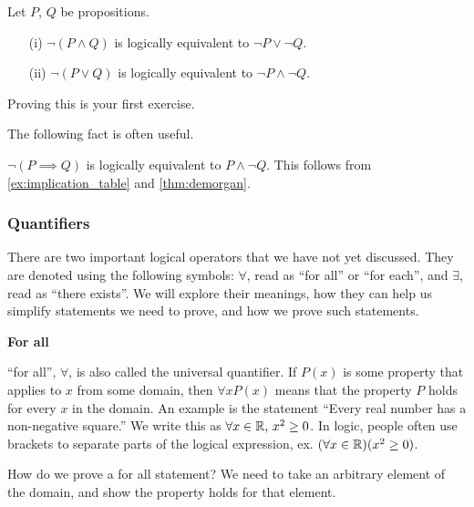 \documentclass{article}
\begin{document}
\vspace{1em}

\begin{theorem}
\label{thm:demorgan}
Let $P$, $Q$ be propositions.
\begin{enumerate}
    \item[(i)] $\neg (P \wedge Q)$ is logically equivalent to $\neg P \vee \neg Q$.
    \item[(ii)] $\neg (P \vee Q)$ is logically equivalent to $\neg P \wedge \neg Q$.
\end{enumerate}
\end{theorem}

Proving this is your first exercise.

\vspace{1em}

The following fact is often useful.
\begin{example}
\label{ex:ifthen}
$\neg (P \implies Q)$ is logically equivalent to $P \wedge \neg Q$. This follows from \cref{ex:implication_table} and \cref{thm:demorgan}.
\end{example}

\subsubsection{Quantifiers}
There are two important logical operators that we have not yet discussed. They are denoted using the following symbols: $\forall$, read as ``for all'' or ``for each'', and $\exists$, read as ``there exists''. We will explore their meanings, how they can help us simplify statements we need to prove, and how we prove such statements.

\vspace{1em}

\textbf{For all}

``for all'', $\forall$, is also called the universal quantifier. If $P(x)$ is some property that applies to $x$ from some domain, then $\forall x P(x)$ means that the property $P$ holds for every $x$ in the domain. An example is the statement ``Every real number has a non-negative square.'' We write this as $\forall x \in {\mathbb{R}}, \, x^2 \geq 0$. In logic, people often use brackets to separate parts of the logical expression, ex. $(\forall x \in {\mathbb{R}}) (x^2 \geq 0)$.

\vspace{1em}

How do we prove a for all statement? We need to take an arbitrary element of the domain, and show the property holds for that element.
\end{document}
